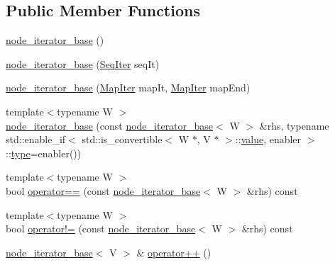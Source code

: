 \subsection*{Public Member Functions}
\begin{DoxyCompactItemize}
\item 
\mbox{\hyperlink{class_y_a_m_l_1_1detail_1_1node__iterator__base_a97f427510ecc4ca463d74d8b0df6a5d8}{node\+\_\+iterator\+\_\+base}} ()
\item 
\mbox{\hyperlink{class_y_a_m_l_1_1detail_1_1node__iterator__base_ae2c5df530341a36f9c39bb59565a294e}{node\+\_\+iterator\+\_\+base}} (\mbox{\hyperlink{class_y_a_m_l_1_1detail_1_1node__iterator__base_a8f7819d74588685905ebe83938c2a89b}{Seq\+Iter}} seq\+It)
\item 
\mbox{\hyperlink{class_y_a_m_l_1_1detail_1_1node__iterator__base_a2d889ebf8bb7b086680dbfed284a69f6}{node\+\_\+iterator\+\_\+base}} (\mbox{\hyperlink{class_y_a_m_l_1_1detail_1_1node__iterator__base_aaa2316d6fa0080ad766fc2429f7a68ed}{Map\+Iter}} map\+It, \mbox{\hyperlink{class_y_a_m_l_1_1detail_1_1node__iterator__base_aaa2316d6fa0080ad766fc2429f7a68ed}{Map\+Iter}} map\+End)
\item 
{\footnotesize template$<$typename W $>$ }\\\mbox{\hyperlink{class_y_a_m_l_1_1detail_1_1node__iterator__base_a4b0fffffde84d495e328bb55b51d547b}{node\+\_\+iterator\+\_\+base}} (const \mbox{\hyperlink{class_y_a_m_l_1_1detail_1_1node__iterator__base}{node\+\_\+iterator\+\_\+base}}$<$ W $>$ \&rhs, typename std\+::enable\+\_\+if$<$ std\+::is\+\_\+convertible$<$ W $\ast$, V $\ast$ $>$\+::\mbox{\hyperlink{glad_8h_a03aff08f73d7fde3d1a08e0abd8e84fa}{value}}, enabler $>$\+::\mbox{\hyperlink{glad_8h_a890efa53b3d7deeeced6f3a0d6653ed3}{type}}=enabler())
\item 
{\footnotesize template$<$typename W $>$ }\\bool \mbox{\hyperlink{class_y_a_m_l_1_1detail_1_1node__iterator__base_abbf381907a9b6dcebf45c31b78b9e3b1}{operator==}} (const \mbox{\hyperlink{class_y_a_m_l_1_1detail_1_1node__iterator__base}{node\+\_\+iterator\+\_\+base}}$<$ W $>$ \&rhs) const
\item 
{\footnotesize template$<$typename W $>$ }\\bool \mbox{\hyperlink{class_y_a_m_l_1_1detail_1_1node__iterator__base_a13d72e654af51b92c078864bddd9322d}{operator!=}} (const \mbox{\hyperlink{class_y_a_m_l_1_1detail_1_1node__iterator__base}{node\+\_\+iterator\+\_\+base}}$<$ W $>$ \&rhs) const
\item 
\mbox{\hyperlink{class_y_a_m_l_1_1detail_1_1node__iterator__base}{node\+\_\+iterator\+\_\+base}}$<$ V $>$ \& \mbox{\hyperlink{class_y_a_m_l_1_1detail_1_1node__iterator__base_aa65eeb36a9c667f4317c3e2f0e3f132f}{operator++}} ()

\end{DoxyCompactItemize}
